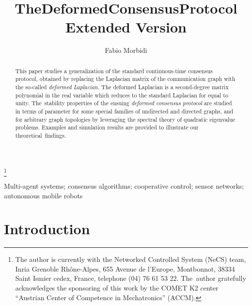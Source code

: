\documentclass[letterpaper,9pt,twocolumn]{autart}
\begin{document}
\runauthor{}
\begin{frontmatter}
\title{The\hspace{0.27cm}Deformed\hspace{0.27cm}Consensus\hspace{0.27cm}Protocol\vspace{0.22cm}\\
\normalsize{Extended Version}}

\thanks[footnoteinfo]{The author is currently with the Networked Controlled System (NeCS)
team, Inria Grenoble Rh\^{o}ne-Alpes, 655 \mbox{Avenue} de l'Europe, Montbonnot,
38334 Saint Ismier cedex, France, telephone (04) 76 61 53 22. 
The~author gratefully acknowledges the sponsoring of this work by the COMET K2 center 
``Austrian Center of Competence in \mbox{Mechatronics}'' (ACCM).}


\author[INRIA]{Fabio Morbidi}
\address[INRIA]{Institute for Design and Control of Mechatronical Systems,
Johannes Kepler University, \mbox{Altenbergerstra\ss e 69, 4040 Linz, Austria}}

\begin{keyword} Multi-agent systems;\; consensus algorithms;\; cooperative control;\; sensor
networks;\; autonomous mobile robots 
\end{keyword}

\begin{abstract}
This paper studies a generalization of the standard continuous-time consensus protocol, obtained
by replacing the Laplacian matrix of the communication graph with the so-called
\emph{deformed Laplacian}. The deformed Laplacian is a second-degree matrix polynomial in the
real variable  which reduces to the standard Laplacian for  equal to unity.
The~stability properties of the ensuing \emph{deformed consensus protocol} are studied in terms
of parameter  for some special families of undirected and directed graphs, and for arbitrary graph
topologies by leveraging the spectral theory of quadratic eigenvalue problems. Examples and
simulation results are provided to illustrate our theoretical~findings. \end{abstract}
\end{frontmatter}
\thispagestyle{empty} 
\pagestyle{empty} 
\pagestyle{plain}

\section{Introduction}\label{SEC:intro}
\end{document}
